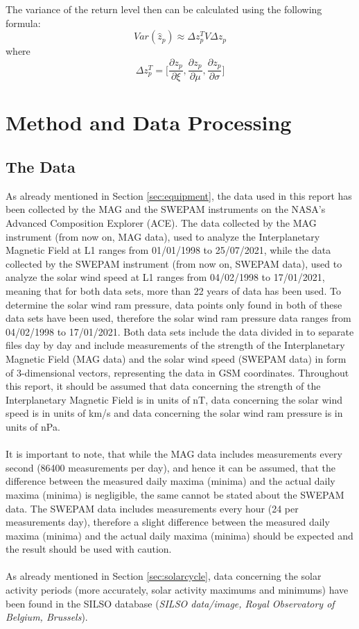 \documentclass[11pt]{article}
\begin{document}
        The variance of the return level then can be calculated using the following formula:
        \begin{equation}
            Var(\hat z_p)\approx \Delta z_p^TV\Delta z_p
        \end{equation}
        where
        \begin{equation}
            \Delta z_p^T=\Bigg [\frac{\partial z_p}{\partial \xi}, \frac{\partial z_p}{\partial \mu}, \frac{\partial z_p}{\partial \sigma}\Bigg ]
        \end{equation}
\section{Method and Data Processing}\label{sec:method}
    \subsection{The Data}\label{sec:data}
        As already mentioned in Section \ref{sec:equipment}, the data used in this report has been collected by the MAG\cite{1998acemag} and the SWEPAM\cite{1998aceswepam} instruments on the NASA's Advanced Composition Explorer (ACE)\cite{1998ace}. The data collected by the MAG instrument (from now on, MAG data), used to analyze the Interplanetary Magnetic Field at L1 ranges from 01/01/1998 to 25/07/2021, while the data collected by the SWEPAM instrument (from now on, SWEPAM data), used to analyze the solar wind speed at L1 ranges from 04/02/1998 to 17/01/2021, meaning that for both data sets, more than 22 years of data has been used. To determine the solar wind ram pressure, data points only found in both of these data sets have been used, therefore the solar wind ram pressure data ranges from 04/02/1998 to 17/01/2021. Both data sets include the data divided in to separate files day by day and include measurements of the strength of the Interplanetary Magnetic Field (MAG data) and the solar wind speed (SWEPAM data) in form of 3-dimensional vectors, representing the data in GSM coordinates. Throughout this report, it should be assumed that data concerning the strength of the Interplanetary Magnetic Field is in units of nT, data concerning the solar wind speed is in units of km/s and data concerning the solar wind ram pressure is in units of nPa.\\ \\
        It is important to note, that while the MAG data includes measurements every second (86400 measurements per day), and hence it can be assumed, that the difference between the measured daily maxima (minima) and the actual daily maxima (minima) is negligible, the same cannot be stated about the SWEPAM data. The SWEPAM data includes measurements every hour (24 per measurements day), therefore a slight difference between the measured daily maxima (minima) and the actual daily maxima (minima) should be expected and the result should be used with caution.\\ \\
        As already mentioned in Section \ref{sec:solarcycle}, data concerning the solar activity periods (more accurately, solar activity maximums and minimums) have been found in the SILSO database (\textit{SILSO data/image, Royal Observatory of Belgium, Brussels}).
\end{document}
